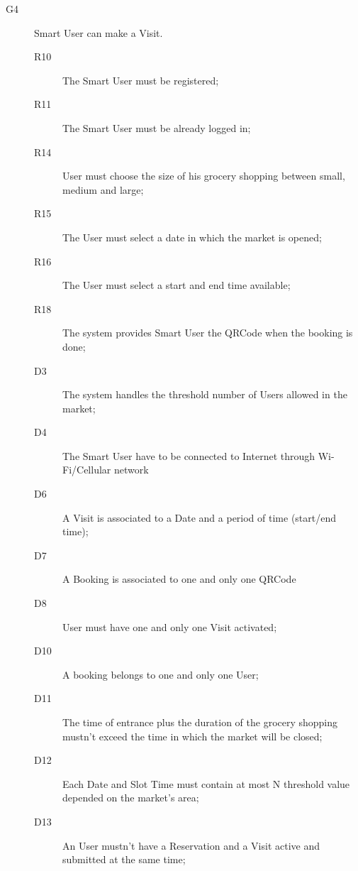\begin{description}
    \item[G4]Smart User can make a Visit.
    \begin{description}
    \item[R10] The Smart User must be registered;
    \item[R11] The Smart User must be already logged in;
    \item[R14] User must choose the size of his grocery shopping between small, medium and large;
    \item[R15] The User must select a date in which the market is opened;
    \item[R16] The User must select a start and end time available;
    \item[R18] The system provides Smart User the QRCode when the booking is done;
    \item[D3] The system handles the threshold number of Users allowed in the market;
    \item[D4] The Smart User have to be connected to Internet through Wi-Fi/Cellular network
    \item[D6] A Visit is associated to a Date and a period of time (start/end time);
    \item[D7] A Booking is associated to one and only one QRCode
    \item[D8] User must have one and only one Visit activated;
    \item[D10] A booking belongs to one and only one User;
    \item[D11] The time of entrance plus the duration of the grocery shopping mustn’t exceed the time in which the market will be closed; 
    \item[D12] Each Date and Slot Time must contain at most N threshold value depended on the market's area;
    \item[D13] An User mustn’t have a Reservation and a Visit active and submitted at the same time; 
    \end{description}
    

\end{description}
